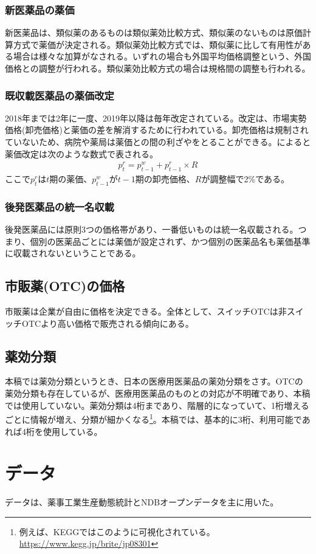 \documentclass[a4paper,11pt,uplatex]{jsarticle}
\theoremstyle{definition}
\begin{document}
\subsubsection{新医薬品の薬価}
新医薬品は、類似薬のあるものは類似薬効比較方式、類似薬のないものは原価計算方式で薬価が決定される。類似薬効比較方式では、類似薬に比して有用性がある場合は様々な加算がなされる。いずれの場合も外国平均価格調整という、外国価格との調整が行われる。類似薬効比較方式の場合は規格間の調整も行われる。
\subsubsection{既収載医薬品の薬価改定}
2018年までは2年に一度、2019年以降は毎年改定されている。改定は、市場実勢価格(卸売価格)と薬価の差を解消するために行われている。卸売価格は規制されていないため、病院や薬局は薬価との間の利ざやをとることができる。\cite{Iizuka2007}によると薬価改定は次のような数式で表される。
\begin{align*}
p^r_t=p^w_{t-1}+p^r_{t-1}\times R
\end{align*}
ここで\(p^r_t\)は\(t\)期の薬価、\(p^w_{t-1}\)が\(t-1\)期の卸売価格、\(R\)が調整幅で2\%である。
\subsubsection{後発医薬品の統一名収載}
後発医薬品には原則3つの価格帯があり、一番低いものは統一名収載される。つまり、個別の医薬品ごとには薬価が設定されず、かつ個別の医薬品名も薬価基準に収載されないということである。
\subsection{市販薬(OTC)の価格}
市販薬は企業が自由に価格を決定できる。全体として、スイッチOTCは非スイッチOTCより高い価格で販売される傾向にある\citep{iseikyoku2021}。

\subsection{薬効分類}
本稿では薬効分類というとき、日本の医療用医薬品の薬効分類をさす。OTCの薬効分類も存在しているが、医療用医薬品のものとの対応が不明確であり、本稿では使用していない。薬効分類は4桁まであり、階層的になっていて、1桁増えるごとに情報が増え、分類が細かくなる\footnote{例えば、KEGGではこのように可視化されている。\url{https://www.kegg.jp/brite/jp08301}}。本稿では、基本的に3桁、利用可能であれば4桁を使用している。
\section{データ} 
データは、薬事工業生産動態統計とNDBオープンデータを主に用いた。
\end{document}
